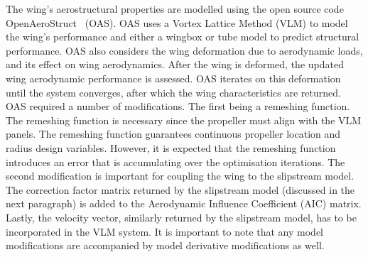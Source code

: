 The wing's aerostructural properties are modelled using the open source code OpenAeroStruct~\cite{Jasa2018a} (OAS). OAS uses a Vortex Lattice Method (VLM) to model the wing's performance and either a wingbox or tube model to predict structural performance. OAS also considers the wing deformation due to aerodynamic loads, and its effect on wing aerodynamics. After the wing is deformed, the updated wing aerodynamic performance is assessed. OAS iterates on this deformation until the system converges, after which the wing characteristics are returned. OAS required a number of modifications. The first being a remeshing function. The remeshing function is necessary since the propeller must align with the VLM panels. The remeshing function guarantees continuous propeller location and radius design variables. However, it is expected that the remeshing function introduces an error that is accumulating over the optimisation iterations. The second modification is important for coupling the wing to the slipstream model. The correction factor matrix returned by the slipstream model (discussed in the next paragraph) is added to the Aerodynamic Influence Coefficient (AIC) matrix. Lastly, the velocity vector, similarly returned by the slipstream model, has to be incorporated in the VLM system. It is important to note that any model modifications are accompanied by model derivative modifications as well.\\
\\
